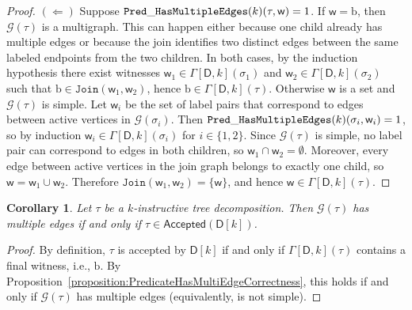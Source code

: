 \documentclass[11pt,a4paper]{article}
\newtheorem{corollary}[theorem]{Corollary}
\newcommand{\truevalue}{1}
\newcommand{\treewidthvalue}{k}
\newcommand{\decompositiongraph}[1]{\mathcal{G}(#1)}
\newcommand{\jointype}{\mathtt{Join}}
\newcommand{\accepteddecompositions}[1]{\mathsf{Accepted}(#1)}
\newcommand{\abstractdecomposition}{\tau}
\newcommand{\sigmaabstractdecomposition}{\sigma}
\newcommand{\awitness}{\mathsf{w}}
\newcommand{\dpcore}{\mathsf{D}}
\newcommand{\dpNamePart}[1]{\mbox{\normalfont\ttfamily #1}}
\newcommand{\predicateHasMultiEdge}[1]{\dpNamePart{Pred}\_\allowbreak\dpNamePart{HasMultipleEdges}(#1)}
\newcommand{\dynamizationfunctionname}[1]{\Gamma[{#1}]}
\newcommand{\dynamizationfunction}[2]{\dynamizationfunctionname{#1,#2}}
\newcommand{\multiedgefound}{\mathrm{b}}
\begin{document}
{\begin{proof}
			$(\Leftarrow)$ Suppose \(\predicateHasMultiEdge{\treewidthvalue}(\abstractdecomposition,\awitness)=\truevalue\). If \(\awitness=\multiedgefound\), then \(\decompositiongraph{\abstractdecomposition}\) is a multigraph. This can happen either because one child already has multiple edges or because the join identifies two distinct edges between the same labeled endpoints from the two children. In both cases, by the induction hypothesis there exist witnesses \(\awitness_1\in \dynamizationfunction{\dpcore}{\treewidthvalue}\allowbreak(\sigmaabstractdecomposition_1)\) and \(\awitness_2\in \dynamizationfunction{\dpcore}{\treewidthvalue}\allowbreak(\sigmaabstractdecomposition_2)\) such that \(\multiedgefound\in \jointype(\awitness_1,\awitness_2)\), hence \(\multiedgefound\in \dynamizationfunction{\dpcore}{\treewidthvalue}\allowbreak(\abstractdecomposition)\). Otherwise \(\awitness\) is a set and \(\decompositiongraph{\abstractdecomposition}\) is simple. Let \(\awitness_i\) be the set of label pairs that correspond to edges between active vertices in \(\decompositiongraph{\sigmaabstractdecomposition_i}\). Then \(\predicateHasMultiEdge{\treewidthvalue}(\sigmaabstractdecomposition_i,\awitness_i)=\truevalue\), so by induction \(\awitness_i\in \dynamizationfunction{\dpcore}{\treewidthvalue}\allowbreak(\sigmaabstractdecomposition_i)\) for \(i\in\{1,2\}\). Since \(\decompositiongraph{\abstractdecomposition}\) is simple, no label pair can correspond to edges in both children, so \(\awitness_1\cap \awitness_2=\emptyset\). Moreover, every edge between active vertices in the join graph belongs to exactly one child, so \(\awitness=\awitness_1\cup \awitness_2\). Therefore \(\jointype(\awitness_1,\awitness_2)=\{\awitness\}\), and hence \(\awitness\in \dynamizationfunction{\dpcore}{\treewidthvalue}\allowbreak(\abstractdecomposition)\).
		\end{proof}

		\begin{corollary}
			\label{corollary:CorrectnessMultiEdge}
			Let \(\abstractdecomposition\) be a \(\treewidthvalue\)-instructive tree decomposition. Then \(\decompositiongraph{\abstractdecomposition}\) has multiple edges
			if and only if \(\abstractdecomposition \in
				\accepteddecompositions{\dpcore[\treewidthvalue]}\).
		\end{corollary}
		\begin{proof}
			By definition, \(\abstractdecomposition\) is accepted by \(\dpcore[\treewidthvalue]\) if and only if \(\dynamizationfunction{\dpcore}{\treewidthvalue}(\abstractdecomposition)\) contains a final witness, i.e., \(\multiedgefound\). By Proposition~\ref{proposition:PredicateHasMultiEdgeCorrectness}, this holds if and only if \(\decompositiongraph{\abstractdecomposition}\) has multiple edges (equivalently, is not simple).
		\end{proof}

}
\end{document}

